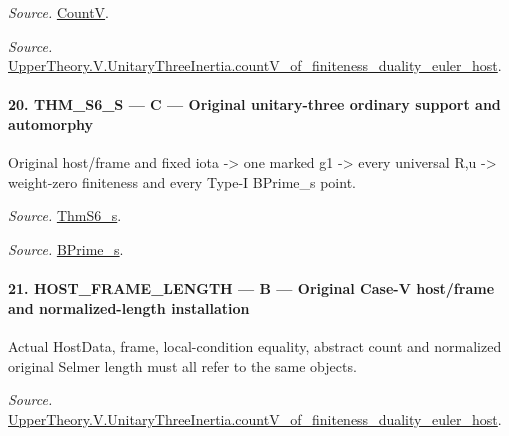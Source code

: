\documentclass[11pt,a4paper]{article}
\numberwithin{equation}{section}
\theoremstyle{remark}\newtheorem{remark}[theorem]{Remark}
\begin{document}
\emph{Source.} \href{https://github.com/CocoSgt/riemann-hypothesis-lean/blob/7cbf7a0c32fca1badf05931879a37c3f8a2b03b4/src/Development/AutomorphicArithmetic/AutomorphicVarieties/HeightAndVanishing/Counts.lean#L69-L69}{CountV}.

\emph{Source.} \href{https://github.com/CocoSgt/riemann-hypothesis-lean/blob/7cbf7a0c32fca1badf05931879a37c3f8a2b03b4/src/Development/AutomorphicArithmetic/AutomorphicVarieties/ModularityArgument/ThresholdArguments/DenseThresholdCases/CountVOf.lean#L33-L60}{UpperTheory.V.UnitaryThreeInertia.countV\_\allowbreak of\_\allowbreak finiteness\_\allowbreak duality\_\allowbreak euler\_\allowbreak host}.



\paragraph{20. THM\_\allowbreak S6\_\allowbreak S — C — Original unitary-three ordinary support and automorphy}

Original host/frame and fixed iota -> one marked g1 -> every universal R,u -> weight-zero finiteness and every Type-I BPrime\_\allowbreak s point.

\emph{Source.} \href{https://github.com/CocoSgt/riemann-hypothesis-lean/blob/7cbf7a0c32fca1badf05931879a37c3f8a2b03b4/src/Development/AutomorphicArithmetic/AutomorphicVarieties/ModularityArgument/ThresholdArguments/DenseThresholdCases/ThmS6CoreS.lean#L17-L26}{ThmS6\_\allowbreak s}.

\emph{Source.} \href{https://github.com/CocoSgt/riemann-hypothesis-lean/blob/7cbf7a0c32fca1badf05931879a37c3f8a2b03b4/src/Development/AutomorphicArithmetic/AutomorphicVarieties/ModularityArgument/ThresholdArguments/DenseThresholdCases/ThmS6CoreS.lean#L12-L16}{BPrime\_\allowbreak s}.



\paragraph{21. HOST\_\allowbreak FRAME\_\allowbreak LENGTH — B — Original Case-V host/frame and normalized-length installation}

Actual HostData, frame, local-condition equality, abstract count and normalized original Selmer length must all refer to the same objects.

\emph{Source.} \href{https://github.com/CocoSgt/riemann-hypothesis-lean/blob/7cbf7a0c32fca1badf05931879a37c3f8a2b03b4/src/Development/AutomorphicArithmetic/AutomorphicVarieties/ModularityArgument/ThresholdArguments/DenseThresholdCases/CountVOf.lean#L33-L60}{UpperTheory.V.UnitaryThreeInertia.countV\_\allowbreak of\_\allowbreak finiteness\_\allowbreak duality\_\allowbreak euler\_\allowbreak host}.
\end{document}
